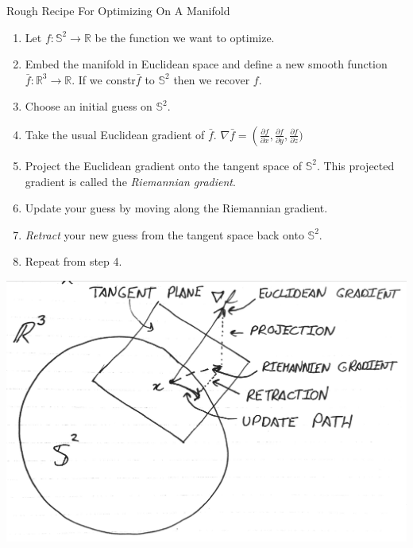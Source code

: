 \documentclass[presentation]{beamer}
\begin{document}
\begin{frame}[label=sec-7]{Rough Recipe For Optimizing On A Manifold}
\begin{enumerate}
\item Let $f:\mathbb{S}^2 \rightarrow \mathbb{R}$ be the function we want to optimize. 
\item {Embed the manifold in Euclidean space and define a new smooth function $\bar{f}: \mathbb{R}^3 \rightarrow \mathbb{R}$. If we 
constr$\bar{f}$ to $\mathbb{S}^2$ then we recover $f$.}
\item Choose an initial guess on $\mathbb{S}^2$. 
\item Take the usual Euclidean gradient of $\bar{f}$. $\nabla \bar{f} = \left(\frac{\partial f}{\partial x}, \frac{\partial f}{\partial y}, \frac{\partial f}{\partial z})$
\item Project the Euclidean gradient onto the tangent space of $\mathbb{S}^2$. This projected gradient is called the \textit{Riemannian gradient}. 
\item Update your guess by moving along the Riemannian gradient. 
\item \textit{Retract} your new guess from the tangent space back onto $\mathbb{S}^2$. 
\item Repeat from step 4.
\end{enumerate}
\end{frame}
\begin{frame}[label=sec-8]{}
\begin{center}
  \includegraphics[width=1.0\textwidth, interpolate=true]{figs/tangent.pdf}\\
\end{center}
\end{frame}
\end{document}
